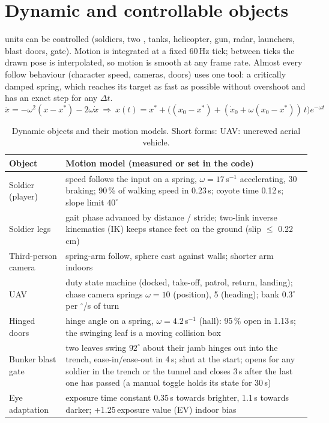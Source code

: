 \section{Dynamic and controllable objects}
\label{sec:dynamic}
\nControllables{} units can be controlled (soldiers, two , tanks, helicopter,  gun, radar, launchers, blast
doors, gate). Motion is integrated at a fixed 60\,Hz tick; between ticks the drawn pose is interpolated, so motion is
smooth at any frame rate. Almost every follow behaviour (character speed, cameras, doors) uses one tool: a
critically damped spring, which reaches its target as fast as possible without overshoot and has an exact step for any $\Delta t$.
\begin{equation}
\ddot x=-\omega^2(x-x^\ast)-2\omega\dot x\ \Rightarrow\
x(t)=x^\ast+\big((x_0-x^\ast)+(\dot x_0+\omega(x_0-x^\ast))\,t\big)e^{-\omega t}
\label{eq:spring}
\end{equation}

\begin{table}[htbp]
\caption{Dynamic objects and their motion models. Short forms: UAV: uncrewed aerial vehicle.}\label{tab:dyn}
\centering\small
\begin{tabularx}{\linewidth}{@{}lX@{}}
\toprule
Object & Motion model (measured or set in the code)\\\midrule
Soldier (player) & speed follows the input on a spring, $\omega=17$\,s$^{-1}$ accelerating, 30 braking; 90\,\% of walking speed in 0.23\,s; coyote time 0.12\,s; slope limit $40^\circ$\\
Soldier legs & gait phase advanced by distance / stride; two-link inverse kinematics (IK) keeps stance feet on the ground (slip $\le$ 0.22\,cm)\\
Third-person camera & spring-arm follow, sphere cast against walls; shorter arm indoors\\
UAV & duty state machine (docked, take-off, patrol, return, landing); chase camera springs $\omega=10$ (position), 5 (heading); bank $0.3^\circ$ per $^\circ$/s of turn\\
Hinged doors & hinge angle on a spring, $\omega=4.2$\,s$^{-1}$ (hall): 95\,\% open in 1.13\,s; the swinging leaf is a moving collision box\\
Bunker blast gate & two leaves swing $92^\circ$ about their jamb hinges out into the trench, ease-in/ease-out in 4\,s; shut at the start; opens for any soldier in the trench or the tunnel and closes 3\,s after the last one has passed (a manual \key{Enter} toggle holds its state for 30\,s)\\
Eye adaptation & exposure time constant 0.35\,s towards brighter, 1.1\,s towards darker; +1.25\,exposure value (EV) indoor bias\\
\bottomrule
\end{tabularx}
\end{table}


